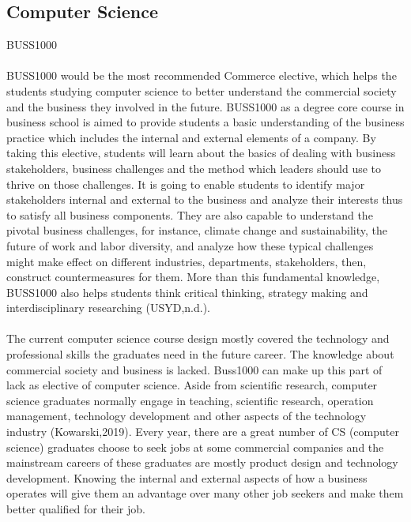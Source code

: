 \documentclass{article}
\begin{document}
	\subsection{Computer Science}
	BUSS1000 \\
	\\
	BUSS1000 would be the most recommended Commerce elective, which helps the students studying computer science to better understand the commercial society and the business they involved in the future. BUSS1000 as a degree core course in business school is aimed to provide students a basic understanding of the business practice which includes the internal and external elements of a company. By taking this elective, students will learn about the basics of dealing with business stakeholders, business challenges and the method which leaders should use to thrive on those challenges. It is going to enable students to identify major stakeholders internal and external to the business and analyze their interests thus to satisfy all business components. They are also capable to understand the pivotal business challenges, for instance, climate change and sustainability, the future of work and labor diversity, and analyze how these typical challenges might make effect on different industries, departments, stakeholders, then, construct countermeasures for them. More than this fundamental knowledge, BUSS1000 also helps students think critical thinking, strategy making and interdisciplinary researching (USYD,n.d.). \\
	\\
	The current computer science course design mostly covered the technology and professional skills the graduates need in the future career. The knowledge about commercial society and business is lacked. Buss1000 can make up this part of lack as elective of computer science. Aside from scientific research, computer science graduates normally engage in teaching, scientific research, operation management, technology development and other aspects of the technology industry (Kowarski,2019). Every year, there are a great number of CS (computer science) graduates choose to seek jobs at some commercial companies and the mainstream careers of these graduates are mostly product design and technology development. Knowing the internal and external aspects of how a business operates will give them an advantage over many other job seekers and make them better qualified for their job. \\
	\\
\end{document}
